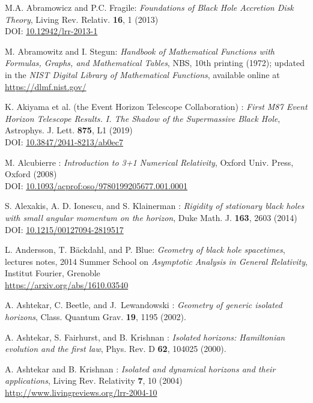 \begin{thebibliography}{123}

M.A. Abramowicz and P.C. Fragile:
{\em Foundations of Black Hole Accretion Disk Theory},
Living Rev. Relativ. {\bf 16}, 1 (2013)\\
DOI: \href{https://doi.org/10.12942/lrr-2013-1}{10.12942/lrr-2013-1}

M. Abramowitz and I. Stegun:
{\em Handbook of Mathematical Functions with Formulas, Graphs, and Mathematical Tables},
NBS, 10th printing (1972); updated in the
{\em NIST Digital Library of Mathematical Functions}, available online at \\
\url{https://dlmf.nist.gov/}

K. Akiyama et al. (the Event Horizon Telescope Collaboration) :
{\em First M87 Event Horizon Telescope Results. I. The Shadow of the Supermassive Black Hole},
Astrophys. J. Lett. {\bf 875}, L1 (2019)\\
DOI: \href{https://doi.org/10.3847/2041-8213/ab0ec7}{10.3847/2041-8213/ab0ec7}

M. Alcubierre :
{\em Introduction to 3+1 Numerical Relativity},
Oxford Univ. Press, Oxford (2008)\\
DOI: \href{https://doi.org/10.1093/acprof:oso/9780199205677.001.0001}{10.1093/acprof:oso/9780199205677.001.0001}

S. Alexakis, A. D. Ionescu, and S. Klainerman : {\em Rigidity of stationary black holes with small angular momentum on the horizon},
Duke Math. J. {\bf 163}, 2603 (2014)\\
DOI: \href{https://doi.org/10.1215/00127094-2819517}{10.1215/00127094-2819517}

L. Andersson, T. Bäckdahl, and P. Blue:
{\em Geometry of black hole spacetimes},
lectures notes,
2014 Summer School on {\em Asymptotic Analysis in General Relativity},
Institut Fourier, Grenoble\\
\url{https://arxiv.org/abs/1610.03540}

A. Ashtekar, C. Beetle, and J.~Lewandowski : {\em Geometry of
generic isolated horizons},
Class. Quantum Grav. {\bf 19}, 1195 (2002).

A. Ashtekar, S. Fairhurst, and B. Krishnan : {\em Isolated horizons:
Hamiltonian evolution and the first law},
Phys. Rev. D {\bf 62}, 104025 (2000).

A. Ashtekar and B. Krishnan : {\em Isolated and dynamical horizons
and their applications},
Living Rev. Relativity {\bf 7}, 10 (2004) \\
\url{http://www.livingreviews.org/lrr-2004-10}


\end{thebibliography}
